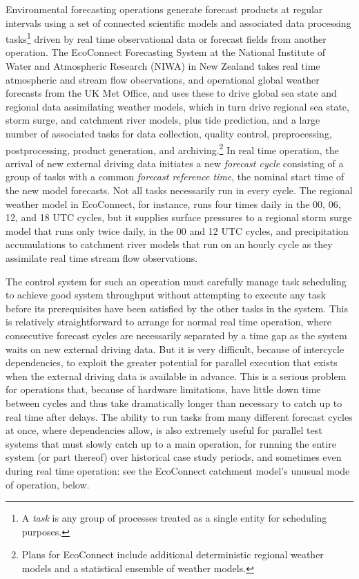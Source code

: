 \documentclass[11pt,a4paper]{article}
\begin{document}
Environmental forecasting operations generate forecast products at
regular intervals using a set of connected scientific models and
associated data processing tasks\footnote{A {\em task} is any group of
processes treated as a single entity for scheduling purposes.} driven by
real time observational data or forecast fields from another operation.
The EcoConnect Forecasting System at the National Institute of Water and
Atmospheric Research (NIWA) in New Zealand takes real time atmospheric
and stream flow observations, and operational global weather forecasts
from the UK Met Office, and uses these to drive global sea state and
regional data assimilating weather models, which in turn drive regional
sea state, storm surge, and catchment river models, plus tide
prediction, and a large number of associated tasks for data collection,
quality control, preprocessing, postprocessing, product generation, and
archiving.\footnote{Plans for EcoConnect include additional
deterministic regional weather models and a statistical ensemble of
weather models.}  In real time operation, the arrival of new external
driving data initiates a new {\em forecast cycle} consisting of a group
of tasks with a common {\em forecast reference time}, the nominal start
time of the new model forecasts. Not all tasks necessarily run in every
cycle. The regional weather model in EcoConnect, for instance, runs four
times daily in the 00, 06, 12, and 18 UTC cycles, but it supplies
surface pressures to a regional storm surge model that runs only twice
daily, in the 00 and 12 UTC cycles, and precipitation accumulations to
catchment river models that run on an hourly cycle as they assimilate
real time stream flow observations. 

The control system for such an operation must carefully manage task
scheduling to achieve good system throughput without attempting to
execute any task before its prerequisites have been satisfied by the
other tasks in the system. This is relatively straightforward to arrange
for normal real time operation, where consecutive forecast cycles are
necessarily separated by a time gap as the system waits on new external
driving data. But it is very difficult, because of intercycle
dependencies, to exploit the greater potential for parallel execution
that exists when the external driving data is available in advance. This
is a serious problem for operations that, because of hardware
limitations, have little down time between cycles and thus take
dramatically longer than necessary to catch up to real time after
delays. The ability to run tasks from many different forecast cycles at
once, where dependencies allow, is also extremely useful for parallel
test systems that must slowly catch up to a main operation, for running
the entire system (or part thereof) over historical case study periods,
and sometimes even during real time operation: see the EcoConnect
catchment model's unusual mode of operation, below.
\end{document}

